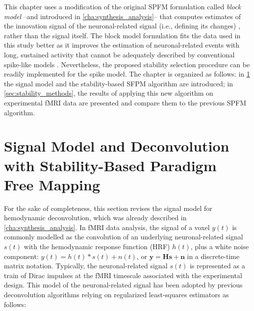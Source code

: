 This chapter uses a modification of the original SPFM formulation called
\textit{block model} --and introduced in \cref{cha:synthesis_analysis}-- that
computes estimates of the innovation signal of the neuronal-related signal
(i.e., defining its changes)
\citep{Karahanoglu2013TotalactivationfMRI,Cherkaoui2019Sparsitybasedblind,Urunuela2023HemodynamicDeconvolutionDemystified},
rather than the signal itself. The block model formulation fits the data used in
this study better as it improves the estimation of neuronal-related events with
long, sustained activity
\citep{Karahanoglu2013TotalactivationfMRI,Cherkaoui2019Sparsitybasedblind,Urunuela2023HemodynamicDeconvolutionDemystified}
that cannot be adequately described by conventional spike-like models
\citep{Khalidov2011ActiveletsWaveletssparse,Gaudes2010Detectioncharacterizationsingle,Gaudes2013Paradigmfreemapping}.
Nevertheless, the proposed stability selection procedure can be readily
implemented for the spike model. The chapter is organized as follows: in
\cref{sec:stability_model} the signal model and the stability-based SFPM
algorithm are introduced; in \cref{sec:stability_methods}, the results of
applying this new algorithm on experimental fMRI data are presented and compare
them to the previous SPFM algorithm.

\section{Signal Model and Deconvolution with Stability-Based Paradigm Free Mapping}
\label{sec:stability_model}
For the sake of completeness, this section revises the signal model for hemodynamic deconvolution, which was already described in \cref{cha:synthesis_analysis}. 
In fMRI data analysis, the signal of a voxel $y(t)$ is commonly modelled as the
convolution of an underlying neuronal-related signal $s(t)$ with the hemodynamic
response function (HRF) $h(t)$, plus a white noise component: $y(t)=
h(t)*s(t)+n(t)$, or $\mathbf{y}=\mathbf{Hs}+\mathbf{n}$ in a discrete-time matrix
notation. Typically, the neuronal-related signal $s(t)$ is represented as a
train of Dirac impulses at the fMRI timescale associated with the experimental
design. This model of the neuronal-related signal has been adopted by previous
deconvolution algorithms
\citep{HernandezGarcia2011Neuronaleventdetection,Gaudes2010Detectioncharacterizationsingle,Gaudes2013Paradigmfreemapping}
relying on regularized least-squares estimators as follows:

